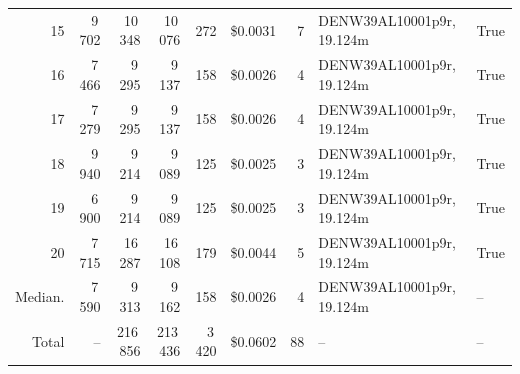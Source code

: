 \documentclass[a4paper,11pt]{article}
\begin{document}
\begin{table}[ht]
\begin{tabular}{r r r r r r r p{3cm} l}
15 & 9\,702 & 10\,348 & 10\,076 & 272 & \$0.0031 & 7 & DENW39AL10001p9r, 19.124m & True \\
16 & 7\,466 & 9\,295 & 9\,137 & 158 & \$0.0026 & 4 & DENW39AL10001p9r, 19.124m & True \\
17 & 7\,279 & 9\,295 & 9\,137 & 158 & \$0.0026 & 4 & DENW39AL10001p9r, 19.124m & True \\
18 & 9\,940 & 9\,214 & 9\,089 & 125 & \$0.0025 & 3 & DENW39AL10001p9r, 19.124m & True \\
19 & 6\,900 & 9\,214 & 9\,089 & 125 & \$0.0025 & 3 & DENW39AL10001p9r, 19.124m & True \\
20 & 7\,715 & 16\,287 & 16\,108 & 179 & \$0.0044 & 5 & DENW39AL10001p9r, 19.124m & True \\
\hline
Median. & 7\,590 & 9\,313 & 9\,162 & 158 & \$0.0026 & 4 & DENW39AL10001p9r, 19.124m & -- \\
Total & -- & 216\,856 & 213\,436 & 3\,420 & \$0.0602 & 88 & -- & -- \\
\hline
\end{tabular}
\end{table}

\clearpage
\end{document}
